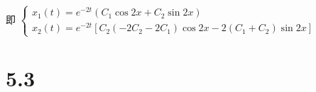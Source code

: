 \begin{enumerate}
                   即 \( \begin{cases} x_{1}(t) = e^{-2t}\left( C_{1}\cos 2x + C_{2}\sin 2x \right) \\
                       x_{2}(t) = e^{-2t}\left[ C_{2}(-2C_{2}-2C_{1})\cos 2x - 2(C_{1}+C_{2})\sin 2x \right]\end{cases} \)
         \end{enumerate}


\section{5.3}

 \subsection{} %

